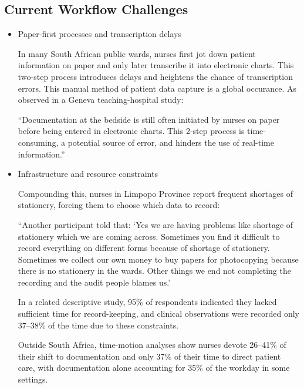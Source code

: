 \documentclass[a4paper,11pt]{article}
\begin{document}
\subsection{Current Workflow Challenges}
\begin{itemize}
  \item Paper‐first processes and transcription delays

In many South African public wards, nurses first jot down patient information on paper and only later transcribe it into electronic charts. This two-step process introduces delays and heightens the chance of transcription errors. This manual method of patient data capture is a global occurance. As observed in a Geneva teaching-hospital study:

“Documentation at the bedside is still often initiated by nurses on paper before being entered in electronic charts. This 2-step process is time-consuming, a potential source of error, and hinders the use of real-time information.”\cite{PDFMobileApplication}

  \item Infrastructure and resource constraints
  
  Compounding this, nurses in Limpopo Province report frequent shortages of stationery, forcing them to choose which data to record:

“Another participant told that: ‘Yes we are having problems like shortage of stationery which we are coming across. Sometimes you find it difficult to record everything on different forms because of shortage of stationery. Sometimes we collect our own money to buy papers for photocopying because there is no stationery in the wards. Other things we end not completing the recording and the audit people blames us.’ \cite{mutshatshiRecordkeepingChallengesExperienced2018}

In a related descriptive study, 95\% of respondents indicated they lacked sufficient time for record-keeping, and clinical observations were recorded only 37–38\% of the time due to these constraints. \cite{olivierRecordKeepingSelfreported2010}

Outside South Africa, time-motion analyses show nurses devote 26–41\% of their shift to documentation and only 37\% of their time to direct patient care, with documentation alone accounting for 35\% of the workday in some settings.\cite{yenNursesTimeAllocation2018}


\end{itemize}
\end{document}
